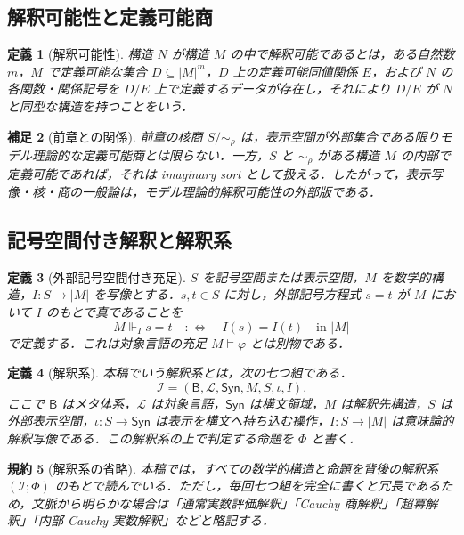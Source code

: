 \documentclass[a4paper,11pt]{ltjsarticle}
\theoremstyle{jpdef}
\newtheorem{definition}{定義}[section]
\newtheorem{remark}[definition]{補足}
\newtheorem{convention}[definition]{規約}
\theoremstyle{jpthm}
\newcommand{\Lang}{\mathcal L}
\begin{document}
\subsection{解釈可能性と定義可能商}

\begin{definition}[解釈可能性]
構造 \(N\) が構造 \(M\) の中で解釈可能であるとは，ある自然数 \(m\)，\(M\) で定義可能な集合 \(D\subseteq |M|^m\)，\(D\) 上の定義可能同値関係 \(E\)，および \(N\) の各関数・関係記号を \(D/E\) 上で定義するデータが存在し，それにより \(D/E\) が \(N\) と同型な構造を持つことをいう．
\end{definition}

\begin{remark}[前章との関係]
前章の核商 \(S/\sim_\rho\) は，表示空間が外部集合である限りモデル理論的な定義可能商とは限らない．一方，\(S\) と \(\sim_\rho\) がある構造 \(M\) の内部で定義可能であれば，それは imaginary sort として扱える．したがって，表示写像・核・商の一般論は，モデル理論的解釈可能性の外部版である．
\end{remark}

\subsection{記号空間付き解釈と解釈系}

\begin{definition}[外部記号空間付き充足]
\(S\) を記号空間または表示空間，\(M\) を数学的構造，\(I:S\to |M|\) を写像とする．\(s,t\in S\) に対し，外部記号方程式 \(s=t\) が \(M\) において \(I\) のもとで真であることを
\[
  M\Vdash_I s=t
  \quad:\Longleftrightarrow\quad
  I(s)=I(t)\quad\text{in } |M|
\]
で定義する．これは対象言語の充足 \(M\models\varphi\) とは別物である．
\end{definition}

\begin{definition}[解釈系]
本稿でいう解釈系とは，次の七つ組である．
\[
  \mathcal I=(\mathsf B,\Lang,\mathsf{Syn},M,S,\iota,I).
\]
ここで \(\mathsf B\) はメタ体系，\(\Lang\) は対象言語，\(\mathsf{Syn}\) は構文領域，\(M\) は解釈先構造，\(S\) は外部表示空間，\(\iota:S\to\mathsf{Syn}\) は表示を構文へ持ち込む操作，\(I:S\to |M|\) は意味論的解釈写像である．この解釈系の上で判定する命題を \(\Phi\) と書く．
\end{definition}

\begin{convention}[解釈系の省略]
本稿では，すべての数学的構造と命題を背後の解釈系 \((\mathcal I;\Phi)\) のもとで読んでいる．ただし，毎回七つ組を完全に書くと冗長であるため，文脈から明らかな場合は「通常実数評価解釈」「Cauchy 商解釈」「超冪解釈」「内部 Cauchy 実数解釈」などと略記する．
\end{convention}
\end{document}
